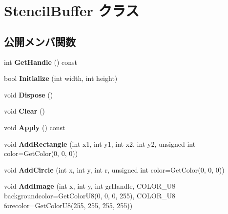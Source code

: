 \hypertarget{class_stencil_buffer}{}\section{Stencil\+Buffer クラス}
\label{class_stencil_buffer}
\subsection*{公開メンバ関数}
\begin{DoxyCompactItemize}
\item 
int {\bfseries Get\+Handle} () const \hypertarget{class_stencil_buffer_aa80be3b0df486edabd1f9eed76d58962}{}\label{class_stencil_buffer_aa80be3b0df486edabd1f9eed76d58962}

\item 
bool {\bfseries Initialize} (int width, int height)\hypertarget{class_stencil_buffer_a454d624f3beacd6966f91dd4f1f32ecf}{}\label{class_stencil_buffer_a454d624f3beacd6966f91dd4f1f32ecf}

\item 
void {\bfseries Dispose} ()\hypertarget{class_stencil_buffer_adea22935abaa1468af6e3718c6de5173}{}\label{class_stencil_buffer_adea22935abaa1468af6e3718c6de5173}

\item 
void {\bfseries Clear} ()\hypertarget{class_stencil_buffer_a61ffa875de404dff989f3c6f2d13769a}{}\label{class_stencil_buffer_a61ffa875de404dff989f3c6f2d13769a}

\item 
void {\bfseries Apply} () const \hypertarget{class_stencil_buffer_a44eef22f9e7d10f5af8c9e787f40b475}{}\label{class_stencil_buffer_a44eef22f9e7d10f5af8c9e787f40b475}

\item 
void {\bfseries Add\+Rectangle} (int x1, int y1, int x2, int y2, unsigned int color=Get\+Color(0, 0, 0))\hypertarget{class_stencil_buffer_adde16b7cfc5e4418a4201b07c27625de}{}\label{class_stencil_buffer_adde16b7cfc5e4418a4201b07c27625de}

\item 
void {\bfseries Add\+Circle} (int x, int y, int r, unsigned int color=Get\+Color(0, 0, 0))\hypertarget{class_stencil_buffer_a4e1e71e7165746a31bf6e1d7b33a524a}{}\label{class_stencil_buffer_a4e1e71e7165746a31bf6e1d7b33a524a}

\item 
void {\bfseries Add\+Image} (int x, int y, int gr\+Handle, C\+O\+L\+O\+R\+\_\+\+U8 backgroundcolor=Get\+Color\+U8(0, 0, 0, 255), C\+O\+L\+O\+R\+\_\+\+U8 forecolor=Get\+Color\+U8(255, 255, 255, 255))\hypertarget{class_stencil_buffer_ad4db6da3777f0c2847d798dc2a7457a9}{}\label{class_stencil_buffer_ad4db6da3777f0c2847d798dc2a7457a9}


\end{DoxyCompactItemize}
